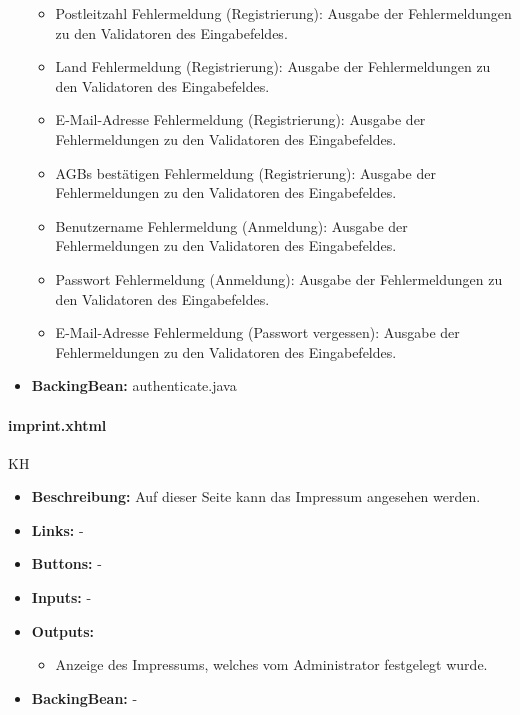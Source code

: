 \begin{itemize}
\begin{itemize}
							\item Postleitzahl Fehlermeldung (Registrierung): Ausgabe der Fehlermeldungen zu den Validatoren des Eingabefeldes.
							\item Land Fehlermeldung (Registrierung): Ausgabe der Fehlermeldungen zu den Validatoren des Eingabefeldes.
							\item E-Mail-Adresse Fehlermeldung (Registrierung): Ausgabe der Fehlermeldungen zu den Validatoren des Eingabefeldes.
							\item AGBs bestätigen Fehlermeldung (Registrierung): Ausgabe der Fehlermeldungen zu den Validatoren des Eingabefeldes.
							\item Benutzername Fehlermeldung (Anmeldung): Ausgabe der Fehlermeldungen zu den Validatoren des Eingabefeldes.
							\item Passwort Fehlermeldung (Anmeldung): Ausgabe der Fehlermeldungen zu den Validatoren des Eingabefeldes.
							\item E-Mail-Adresse Fehlermeldung (Passwort vergessen): Ausgabe der Fehlermeldungen zu den Validatoren des Eingabefeldes.
						\end{itemize}
					\item \textbf{BackingBean:} authenticate.java
				\end{itemize}
				
				\paragraph{imprint.xhtml}
					KH\\
					\begin{itemize}
						\item \textbf{Beschreibung:} Auf dieser Seite kann das Impressum angesehen werden.
						\item \textbf{Links:} -
						\item \textbf{Buttons:} -
						\item \textbf{Inputs:} -
						\item \textbf{Outputs:} 
							\begin{itemize}
								\item	Anzeige des Impressums, welches vom Administrator festgelegt wurde.
							\end{itemize}
						\item \textbf{BackingBean:} -
					\end{itemize}
				
